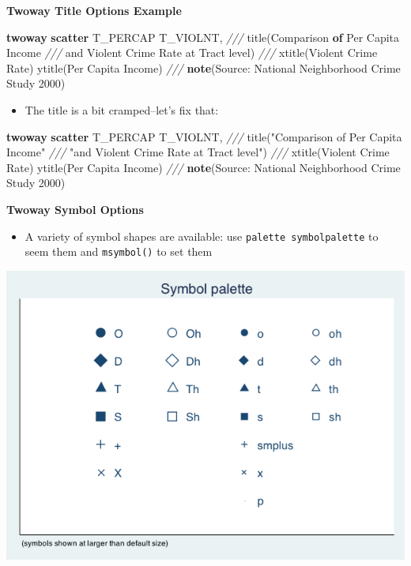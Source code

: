 \documentclass[]{book}
\newenvironment{Shaded}{\begin{snugshade}}{\end{snugshade}}
\newcommand{\BaseNTok}[1]{\textcolor[rgb]{0.00,0.00,0.81}{#1}}
\newcommand{\CommentTok}[1]{\textcolor[rgb]{0.56,0.35,0.01}{\textit{#1}}}
\newcommand{\DecValTok}[1]{\textcolor[rgb]{0.00,0.00,0.81}{#1}}
\newcommand{\FunctionTok}[1]{\textcolor[rgb]{0.00,0.00,0.00}{#1}}
\newcommand{\KeywordTok}[1]{\textcolor[rgb]{0.13,0.29,0.53}{\textbf{#1}}}
\newcommand{\NormalTok}[1]{#1}
\newcommand{\StringTok}[1]{\textcolor[rgb]{0.31,0.60,0.02}{#1}}
\providecommand{\tightlist}{%
  \setlength{\itemsep}{0pt}\setlength{\parskip}{0pt}}
\begin{document}
\textbf{Twoway Title Options Example}

\begin{Shaded}
\begin{Highlighting}[]
  \KeywordTok{twoway} \KeywordTok{scatter}\NormalTok{ T_PERCAP T_VIOLNT, }\CommentTok{///}
      \BaseNTok{title}\NormalTok{(Comparison }\KeywordTok{of}\NormalTok{ Per Capita Income }\CommentTok{///}
\NormalTok{            and Violent Crime Rate }\FunctionTok{at}\NormalTok{ Tract }\DecValTok{level}\NormalTok{) }\CommentTok{///}
  \BaseNTok{xtitle}\NormalTok{(Violent Crime Rate) }\BaseNTok{ytitle}\NormalTok{(Per Capita Income) }\CommentTok{///}
      \KeywordTok{note}\NormalTok{(Source: National Neighborhood Crime Study 2000) }
\end{Highlighting}
\end{Shaded}

\begin{itemize}
\tightlist
\item
  The title is a bit cramped--let's fix that:
\end{itemize}

\begin{Shaded}
\begin{Highlighting}[]
  \KeywordTok{twoway} \KeywordTok{scatter}\NormalTok{ T_PERCAP T_VIOLNT, }\CommentTok{///}
      \BaseNTok{title}\NormalTok{(}\StringTok{"Comparison of Per Capita Income"} \CommentTok{///}
  \StringTok{"and Violent Crime Rate at Tract level"}\NormalTok{) }\CommentTok{///}
  \BaseNTok{xtitle}\NormalTok{(Violent Crime Rate) }\BaseNTok{ytitle}\NormalTok{(Per Capita Income) }\CommentTok{///}
  \KeywordTok{note}\NormalTok{(Source: National Neighborhood Crime Study 2000) }
\end{Highlighting}
\end{Shaded}

\textbf{Twoway Symbol Options}

\begin{itemize}
\tightlist
\item
  A variety of symbol shapes are available: use \texttt{palette\ symbolpalette} to seem them and \texttt{msymbol()} to set them
\end{itemize}

\includegraphics{Stata/StataModGraph/images/Symbol.png}
\end{document}
